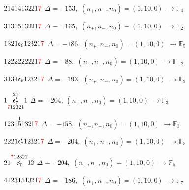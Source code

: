 \documentclass[10pt]{article}
\begin{document}
\smallskip

$2141413221\textcolor{red}{7}$ \quad $\Delta=-153,\; (n_+,n_-,n_0)=(1,10,0)$ \quad $\to \mathbb{F}_{4}$

\smallskip

$3131513221\textcolor{red}{7}$ \quad $\Delta=-165,\; (n_+,n_-,n_0)=(1,10,0)$ \quad $\to \mathbb{F}_{2}$

\smallskip

$1321\mathfrak{e}_612321\textcolor{red}{7}$ \quad $\Delta=-186,\; (n_+,n_-,n_0)=(1,10,0)$ \quad $\to \mathbb{F}_{5}$

\smallskip

$1222222221\textcolor{red}{7}$ \quad $\Delta=-88,\; (n_+,n_-,n_0)=(1,10,0)$ \quad $\to \mathbb{F}_{-2}$

\smallskip

$3131\mathfrak{e}_612321\textcolor{red}{7}$ \quad $\Delta=-193,\; (n_+,n_-,n_0)=(1,10,0)$ \quad $\to \mathbb{F}_{3}$

\smallskip

$1\overset{21}{\underset{\textcolor{red}{7}12321}{\mathfrak{e}_7'}}1$ \quad $\Delta=-204,\; (n_+,n_-,n_0)=(1,10,0)$ \quad $\to \mathbb{F}_{3}$

\smallskip

$1231\overset{1}{5}1321\textcolor{red}{7}$ \quad $\Delta=-158,\; (n_+,n_-,n_0)=(1,10,0)$ \quad $\to \mathbb{F}_{3}$

\smallskip

$2221\mathfrak{e}_7'12321\textcolor{red}{7}$ \quad $\Delta=-204,\; (n_+,n_-,n_0)=(1,10,0)$ \quad $\to \mathbb{F}_{5}$

\smallskip

$21\overset{\textcolor{red}{7}12321}{\mathfrak{e}_7'}12$ \quad $\Delta=-204,\; (n_+,n_-,n_0)=(1,10,0)$ \quad $\to \mathbb{F}_{5}$

\smallskip

$4123151321\textcolor{red}{7}$ \quad $\Delta=-186,\; (n_+,n_-,n_0)=(1,10,0)$ \quad $\to \mathbb{F}_{7}$
\end{document}
